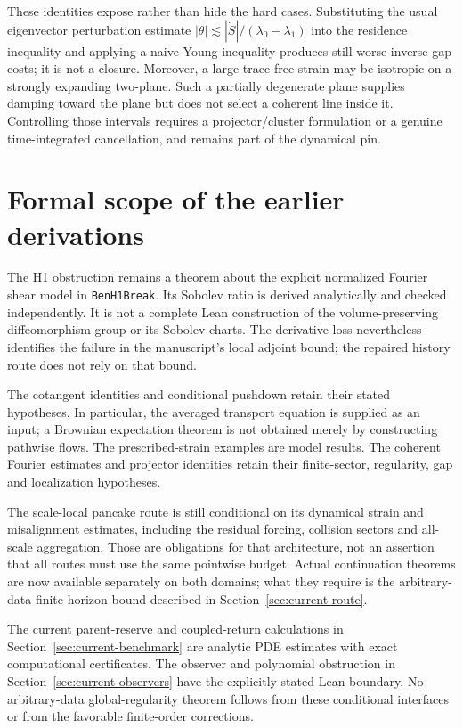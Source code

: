 \documentclass[11pt]{article}
\theoremstyle{definition}
\begin{document}
These identities expose rather than hide the hard cases.  Substituting the
usual eigenvector perturbation estimate
$|\theta|\lesssim|\dot S|/(\lambda_0-\lambda_1)$ into the residence inequality
and applying a naive Young inequality produces still worse inverse-gap costs;
it is not a closure.  Moreover, a large trace-free strain may be isotropic on
a strongly expanding two-plane.  Such a partially degenerate plane supplies
damping toward the plane but does not select a coherent line inside it.
Controlling those intervals requires a projector/cluster formulation or a
genuine time-integrated cancellation, and remains part of the dynamical pin.

\section{Formal scope of the earlier derivations}
\label{sec:scope}

The H1 obstruction remains a theorem about the explicit normalized Fourier
shear model in \texttt{BenH1Break}. Its Sobolev ratio is derived analytically
and checked independently. It is not a complete Lean construction of the
volume-preserving diffeomorphism group or its Sobolev charts. The derivative
loss nevertheless identifies the failure in the manuscript's local adjoint
bound; the repaired history route does not rely on that bound.

The cotangent identities and conditional pushdown retain their stated
hypotheses. In particular, the averaged transport equation is supplied as an
input; a Brownian expectation theorem is not obtained merely by constructing
pathwise flows. The prescribed-strain examples are model results. The coherent
Fourier estimates and projector identities retain their finite-sector,
regularity, gap and localization hypotheses.

The scale-local pancake route is still conditional on its dynamical strain
and misalignment estimates, including the residual forcing, collision sectors
and all-scale aggregation. Those are obligations for that architecture,
not an assertion that all routes must use the same pointwise budget.
Actual continuation theorems are now available separately on both domains;
what they require is the arbitrary-data finite-horizon bound described in
Section~\ref{sec:current-route}.

The current parent-reserve and coupled-return calculations in
Section~\ref{sec:current-benchmark} are analytic PDE estimates with exact
computational certificates. The observer and polynomial obstruction in
Section~\ref{sec:current-observers} have the explicitly stated Lean boundary.
No arbitrary-data global-regularity theorem follows from these conditional
interfaces or from the favorable finite-order corrections.
\end{document}
